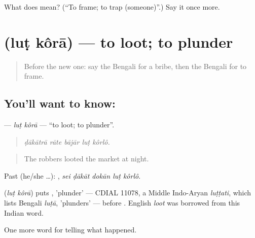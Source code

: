 \begin{tcolorbox}[breakable,colback=teal!4,colframe=teal!35!black,title={Before you move on}]
What does  mean? (\textquotedblleft{}To frame; to trap (someone)\textquotedblright{}.) Say it once more.
\end{tcolorbox}
\section[\texorpdfstring{\bn{লুট} \bn{করা} (luṭ kôrā)}{লুট করা (luṭ kôrā)}]{  (luṭ kôrā) — to loot; to plunder}

\label{lesson:BN-C285-lut-kora}



\begin{quote}
Before the new one: say the Bengali for a bribe, then the Bengali for to frame.
\end{quote}

\subsection*{You'll want to know:  }
\textbf{ } — \emph{luṭ kôrā} — \textquotedblleft{}to loot; to plunder\textquotedblright{}.

\begin{quote}
    
\end{quote}

\begin{quote}
\emph{ḍākātrā rāte bājār luṭ kôrlô.}
\end{quote}

\begin{quote}
The robbers looted the market at night.
\end{quote}

Past (he/she …):     , \emph{sei ḍākāt dokān luṭ kôrlô}.

\begin{cousinweb}
\textbf{ } (\emph{luṭ kôrā}) puts , 'plunder' — CDIAL 11078, a Middle Indo-Aryan \emph{luṭṭati}, which lists Bengali \emph{luṭā}, 'plunders' — before . English \emph{loot} was borrowed from this Indian word.
\end{cousinweb}

\begin{grammarlens}[title={What you've built}]
One more word for telling what happened.
\end{grammarlens}

